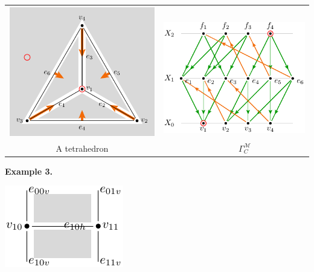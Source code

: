 \documentclass[11pt,oneside]{article}
\newcommand{\MM}{\mathcal{M}}
\begin{document}
\begin{center}
\begin{tabular}{cc}
\includegraphics[]{images/pic-complex-tetra} & 
\ \ \ \ \ \includegraphics[]{images/pic-poset-tetra} \\
A tetrahedron &
\ \ \ \ \ $\Gamma_C^\MM$ 
\end{tabular}
\end{center}


\noindent
{\bf Example 3.}


\begin{center}
\includegraphics[scale=0.8]{images/pic-complex-surface}
\end{center}



{}

\end{document}
